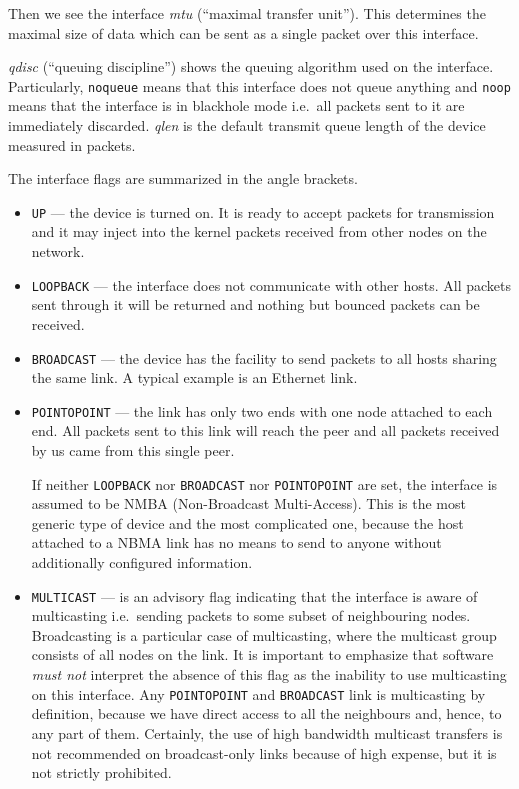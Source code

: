 Then we see the interface {\em mtu\/} (``maximal transfer unit''). This determines
the maximal size of data which can be sent as a single packet over this interface.

{\em qdisc\/} (``queuing discipline'') shows the queuing algorithm used
on the interface. Particularly, \verb|noqueue| means that this interface
does not queue anything and \verb|noop| means that the interface is in blackhole
mode i.e.\ all packets sent to it are immediately discarded.
{\em qlen\/} is the default transmit queue length of the device measured
in packets.

The interface flags are summarized in the angle brackets.

\begin{itemize}
\item \verb|UP| --- the device is turned on. It is ready to accept
packets for transmission and it may inject into the kernel packets received
from other nodes on the network.

\item \verb|LOOPBACK| --- the interface does not communicate with other
hosts. All packets sent through it will be returned
and nothing but bounced packets can be received.

\item \verb|BROADCAST| --- the device has the facility to send packets
to all hosts sharing the same link. A typical example is an Ethernet link.

\item \verb|POINTOPOINT| --- the link has only two ends with one node
attached to each end. All packets sent to this link will reach the peer
and all packets received by us came from this single peer.

If neither \verb|LOOPBACK| nor \verb|BROADCAST| nor \verb|POINTOPOINT|
are set, the interface is assumed to be NMBA (Non-Broadcast Multi-Access).
This is the most generic type of device and the most complicated one, because
the host attached to a NBMA link has no means to send to anyone
without additionally configured information.

\item \verb|MULTICAST| --- is an advisory flag indicating that the interface
is aware of multicasting i.e.\ sending packets to some subset of neighbouring
nodes. Broadcasting is a particular case of multicasting, where the multicast
group consists of all nodes on the link. It is important to emphasize
that software {\em must not\/} interpret the absence of this flag as the inability
to use multicasting on this interface. Any \verb|POINTOPOINT| and
\verb|BROADCAST| link is multicasting by definition, because we have
direct access to all the neighbours and, hence, to any part of them.
Certainly, the use of high bandwidth multicast transfers is not recommended
on broadcast-only links because of high expense, but it is not strictly
prohibited.


\end{itemize}
